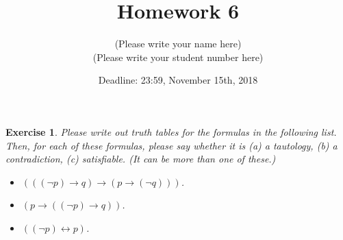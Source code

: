 \documentclass[12pt,a4paper]{article}
\title{Homework 6}
\author{(Please write your name here)\\
(Please write your student number here)}
\date{Deadline: 23:59, November 15th, 2018}
\theoremstyle{plain}
\newtheorem{exercise}{Exercise}
\begin{document}
\maketitle



\begin{exercise}
Please write out truth tables for the formulas in the following list.
Then, for each of these formulas, please say whether it is (a) a tautology, (b) a contradiction, (c) satisfiable. 
(It can be more than one of these.)
%
\begin{itemize}

\item[(a)] $( ( ( \neg p ) \rightarrow q ) \rightarrow ( p \rightarrow ( \neg q ) ) )$.

\item[(b)] $( p \rightarrow ( ( \neg p ) \rightarrow q ) )$.

\item[(c)] $( ( \neg p ) \leftrightarrow p )$.

\end{itemize}
\end{exercise}
\end{document}
